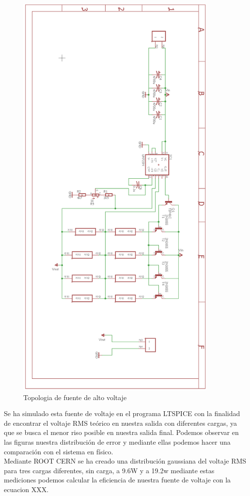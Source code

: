 \begin{figure}[H]
\centering
\includegraphics[width=10cm]{Capitulo3/figs/fuente.png}
\caption{Topologia de fuente de alto voltaje}
\end{figure}

Se ha simulado esta fuente de voltaje en el programa LTSPICE con la finalidad de encontrar el voltaje RMS teórico en nuestra salida con diferentes cargas, ya que se busca el menor riso posible en nuestra salida final. Podemos observar en las figuras nuestra distribución de error y mediante ellas podemos hacer una comparación con el sistema en físico.\\

Mediante ROOT CERN se ha creado una distribución gaussiana del voltaje RMS para tres cargas diferentes, sin carga, a 9.6W y a 19.2w mediante estas mediciones podemos calcular la eficiencia de nuestra fuente de voltaje con la ecuacion XXX.\\

